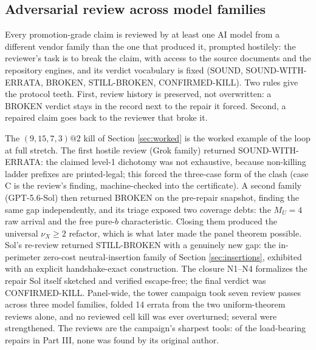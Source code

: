 \documentclass[11pt]{article}
\theoremstyle{definition}
\theoremstyle{remark}
\begin{document}
\subsection{Adversarial review across model families}\label{sec:review}

Every promotion-grade claim is reviewed by at least one AI model from a different vendor family than the one that produced it, prompted hostilely: the reviewer's task is to break the claim, with access to the source documents and the repository engines, and its verdict vocabulary is fixed (SOUND, SOUND-WITH-ERRATA, BROKEN, STILL-BROKEN, CONFIRMED-KILL). Two rules give the protocol teeth. First, review history is preserved, not overwritten: a BROKEN verdict stays in the record next to the repair it forced. Second, a repaired claim goes back to the reviewer that broke it.

The $(9,15,7,3)@2$ kill of Section \ref{sec:worked} is the worked example of the loop at full stretch. The first hostile review (Grok family) returned SOUND-WITH-ERRATA: the claimed level-1 dichotomy was not exhaustive, because non-killing ladder prefixes are printed-legal; this forced the three-case form of the clash (case C is the review's finding, machine-checked into the certificate). A second family (GPT-5.6-Sol) then returned BROKEN on the pre-repair snapshot, finding the same gap independently, and its triage exposed two coverage debts: the $M_U=4$ raw arrival and the free pure-$b$ characteristic. Closing them produced the universal $\nu_X\geq2$ refactor, which is what later made the panel theorem possible. Sol's re-review returned STILL-BROKEN with a genuinely new gap: the in-perimeter zero-cost neutral-insertion family of Section \ref{sec:insertions}, exhibited with an explicit handshake-exact construction. The closure N1--N4 formalizes the repair Sol itself sketched and verified escape-free; the final verdict was CONFIRMED-KILL. Panel-wide, the tower campaign took seven review passes across three model families, folded 14 errata from the two uniform-theorem reviews alone, and no reviewed cell kill was ever overturned; several were strengthened. The reviews are the campaign's sharpest tools: of the load-bearing repairs in Part III, none was found by its original author.
\end{document}

